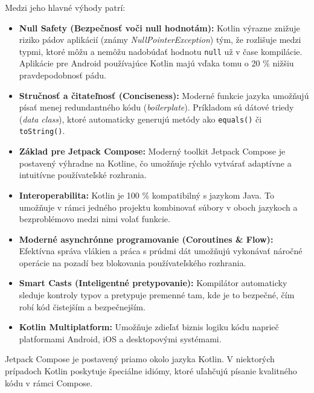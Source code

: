 Medzi jeho hlavné výhody patrí:
\begin{itemize}
    \item \textbf{Null Safety (Bezpečnosť voči null hodnotám):} Kotlin výrazne znižuje riziko pádov aplikácií (známy \textit{NullPointerException}) tým, že rozlišuje medzi typmi, ktoré môžu a nemôžu nadobúdať hodnotu \texttt{null} už v čase kompilácie. Aplikácie pre Android používajúce Kotlin majú vďaka tomu o 20 \% nižšiu pravdepodobnosť pádu.
    \item \textbf{Stručnosť a čitateľnosť (Conciseness):} Moderné funkcie jazyka umožňujú písať menej redundantného kódu (\textit{boilerplate}). Príkladom sú dátové triedy (\textit{data class}), ktoré automaticky generujú metódy ako \texttt{equals()} či \texttt{toString()}.
    \item \textbf{Základ pre Jetpack Compose:} Moderný toolkit Jetpack Compose je postavený výhradne na Kotline, čo umožňuje rýchlo vytvárať adaptívne a intuitívne používateľské rozhrania.
    \item \textbf{Interoperabilita:} Kotlin je 100 \% kompatibilný s jazykom Java. To umožňuje v rámci jedného projektu kombinovať súbory v oboch jazykoch a bezproblémovo medzi nimi volať funkcie.
    \item \textbf{Moderné asynchrónne programovanie (Coroutines \& Flow):} Efektívna správa vlákien a práca s prúdmi dát umožňujú vykonávať náročné operácie na pozadí bez blokovania používateľského rozhrania.
    \item \textbf{Smart Casts (Inteligentné pretypovanie):} Kompilátor automaticky sleduje kontroly typov a pretypuje premenné tam, kde je to bezpečné, čím robí kód čistejším a bezpečnejším.
    \item \textbf{Kotlin Multiplatform:} Umožňuje zdieľať biznis logiku kódu naprieč platformami Android, iOS a desktopovými systémami.
\end{itemize}


Jetpack Compose je postavený priamo okolo jazyka Kotlin. V niektorých prípadoch Kotlin poskytuje špeciálne idiómy, ktoré uľahčujú písanie kvalitného kódu v rámci Compose.
